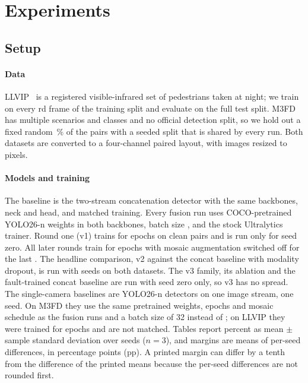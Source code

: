 \section{Experiments}
\label{sec:experiments}
\subsection{Setup}
\label{sec:setup}
\paragraph{Data}
LLVIP~\cite{jia2021llvip} is a registered visible-infrared set of pedestrians taken at night; we train on every \cfgLlvipStride{}rd frame of the training split and evaluate on the full test split. M3FD~\cite{liu2022tardal} has multiple scenarios and classes and no official detection split, so we hold out a fixed random \cfgMfdValPercent{}\,\% of the pairs with a seeded split that is shared by every run. Both datasets are converted to a four-channel paired layout, with images resized to \cfgImgsz{} pixels.

\paragraph{Models and training}
The baseline is the two-stream concatenation detector with the same backbones, neck and head, and matched training. Every fusion run uses COCO-pretrained YOLO26-n weights in both backbones, batch size \cfgBatch{}, and the stock Ultralytics trainer. Round one (v1) trains for \cfgEpochsPilot{} epochs on clean pairs and is run only for seed zero. All later rounds train for \cfgEpochs{} epochs with mosaic augmentation switched off for the last \cfgCloseMosaic{}. The headline comparison, v2 against the concat baseline with modality dropout, is run with \cfgSeedCount{} seeds on both datasets. The v3 family, its ablation and the fault-trained concat baseline are run with seed zero only, so v3 has no spread. The single-camera baselines are YOLO26-n detectors on one image stream, one seed. On M3FD they use the same pretrained weights, \cfgEpochs{} epochs and mosaic schedule as the fusion runs and a batch size of 32 instead of \cfgBatch{}; on LLVIP they were trained for \cfgEpochsPilot{} epochs and are not matched. Tables report percent as mean $\pm$ sample standard deviation over seeds ($n=3$), and margins are means of per-seed differences, in percentage points (pp). A printed margin can differ by a tenth from the difference of the printed means because the per-seed differences are not rounded first.

